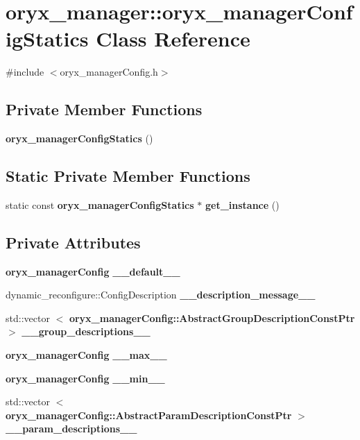 \section{oryx\-\_\-manager\-:\-:oryx\-\_\-manager\-Config\-Statics \-Class \-Reference}
\label{classoryx__manager_1_1oryx__managerConfigStatics}


{\ttfamily \#include $<$oryx\-\_\-manager\-Config.\-h$>$}

\subsection*{\-Private \-Member \-Functions}
\begin{DoxyCompactItemize}
\item 
{\bf oryx\-\_\-manager\-Config\-Statics} ()
\end{DoxyCompactItemize}
\subsection*{\-Static \-Private \-Member \-Functions}
\begin{DoxyCompactItemize}
\item 
static const \*
{\bf oryx\-\_\-manager\-Config\-Statics} $\ast$ {\bf get\-\_\-instance} ()
\end{DoxyCompactItemize}
\subsection*{\-Private \-Attributes}
\begin{DoxyCompactItemize}
\item 
{\bf oryx\-\_\-manager\-Config} {\bf \-\_\-\-\_\-default\-\_\-\-\_\-}
\item 
dynamic\-\_\-reconfigure\-::\-Config\-Description {\bf \-\_\-\-\_\-description\-\_\-message\-\_\-\-\_\-}
\item 
std\-::vector\*
$<$ {\bf oryx\-\_\-manager\-Config\-::\-Abstract\-Group\-Description\-Const\-Ptr} $>$ {\bf \-\_\-\-\_\-group\-\_\-descriptions\-\_\-\-\_\-}
\item 
{\bf oryx\-\_\-manager\-Config} {\bf \-\_\-\-\_\-max\-\_\-\-\_\-}
\item 
{\bf oryx\-\_\-manager\-Config} {\bf \-\_\-\-\_\-min\-\_\-\-\_\-}
\item 
std\-::vector\*
$<$ {\bf oryx\-\_\-manager\-Config\-::\-Abstract\-Param\-Description\-Const\-Ptr} $>$ {\bf \-\_\-\-\_\-param\-\_\-descriptions\-\_\-\-\_\-}
\end{DoxyCompactItemize}
